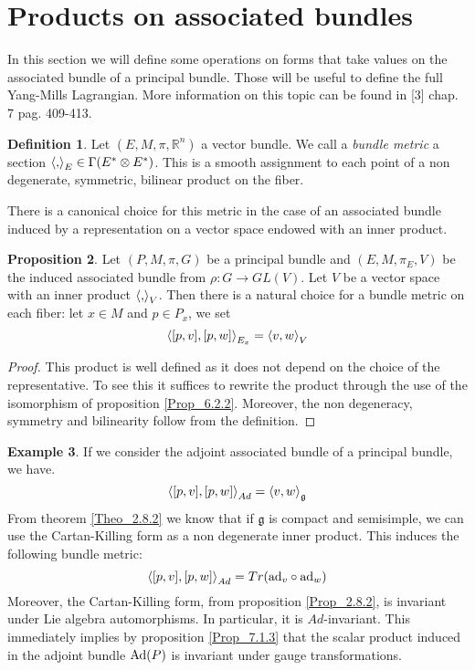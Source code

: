 \documentclass[12pt,a4paper]{report}
\theoremstyle{definition}
\newtheorem{Def}{Definition}[chapter]
\theoremstyle{Theorem}
\newtheorem{Prop}[Def]{Proposition}
\theoremstyle{definition}
\newtheorem{Ex}[Def]{Example}
\theoremstyle{definition}
\begin{document}
	\section{Products on associated bundles}
	In this section we will define some operations on forms that take values on the associated bundle of a principal bundle. Those will be useful to define the full Yang-Mills Lagrangian. More information on this topic can be found in [3] chap. 7 pag. 409-413.
	\begin{Def}
		Let $(E,M,\pi,\mathbb{R}^n)$ a vector bundle. We call a \textit{bundle metric} a section $\braket{,}_E\in \Gamma(E^*\otimes E^*)$. This is a smooth assignment to each point of a non degenerate, symmetric, bilinear product on the fiber.
	\end{Def}
	There is a canonical choice for this metric in the case of an associated bundle induced by a representation on a vector space endowed with an inner product.
	\begin{Prop}\label{Prop_7.3.1}
		Let $(P,M,\pi,G)$ be a principal bundle and $(E,M,\pi_E,V)$ be the induced associated bundle from $\rho:G\rightarrow GL(V)$. Let $V$ be a vector space with an inner product $\braket{,}_V$. Then there is a natural choice for a bundle metric on each fiber: let $x\in M$ and $p\in P_x$, we set 
		$$\braket{[p,v],[p,w]}_{E_x}=\braket{v,w}_V$$
	\end{Prop}
	\begin{proof}
		This product is well defined as it does not depend on the choice of the representative. To see this it suffices to rewrite the product through the use of the isomorphism of proposition \ref{Prop_6.2.2}. Moreover, the non degeneracy, symmetry and bilinearity follow from the definition.
	\end{proof}
	\begin{Ex}
		If we consider the adjoint associated bundle of a principal bundle, we have.
		$$\braket{[p,v],[p,w]}_{Ad}=\braket{v,w}_\mathfrak{g}$$
		From theorem \ref{Theo_2.8.2} we know that if $\mathfrak{g}$ is compact and semisimple, we can use the Cartan-Killing form as a non degenerate inner product. This induces the following bundle metric:
		$$\braket{[p,v],[p,w]}_{Ad}=Tr(\hbox{ad}_v\circ\hbox{ad}_w)$$
		Moreover, the Cartan-Killing form, from proposition \ref{Prop_2.8.2}, is invariant under Lie algebra automorphisms. In particular, it is $Ad$-invariant. This immediately implies by proposition \ref{Prop_7.1.3} that the scalar product induced in the adjoint bundle $\hbox{Ad}(P)$ is invariant under gauge transformations.
	\end{Ex}
\end{document}
